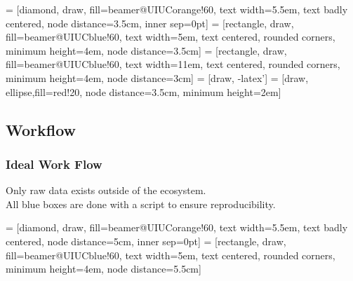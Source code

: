\documentclass{beamer}\usepackage[]{graphicx}\usepackage[]{color}
\begin{document}
 = [diamond, draw, fill=beamer@UIUCorange!60, 
    text width=5.5em, text badly centered, node distance=3.5cm, inner sep=0pt]
 = [rectangle, draw, fill=beamer@UIUCblue!60, 
    text width=5em, text centered, rounded corners, minimum height=4em, node distance=3.5cm]
 = [rectangle, draw, fill=beamer@UIUCblue!60, 
    text width=11em, text centered, rounded corners, minimum height=4em, node distance=3cm]
 = [draw, -latex']
 = [draw, ellipse,fill=red!20, node distance=3.5cm,
    minimum height=2em]

\subsection{Workflow}
\begin{frame}
\frametitle{Ideal Work Flow}

Only raw data exists outside of the ecosystem. 
\\
All blue boxes are done with a script to ensure reproducibility.
\end{frame}


 = [diamond, draw, fill=beamer@UIUCorange!60, 
    text width=5.5em, text badly centered, node distance=5cm, inner sep=0pt]
 = [rectangle, draw, fill=beamer@UIUCblue!60, 
    text width=5em, text centered, rounded corners, minimum height=4em, node distance=5.5cm]
\end{document}
